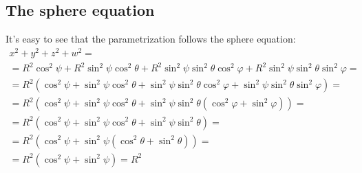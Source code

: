 \documentclass{article}
\begin{document}
\subsection{The sphere equation}
It's easy to see that the parametrization follows the sphere equation:
\begin{equation}
\begin{gathered}
    x^2 + y^2 + z^2 + w^2 = \\
    = R^2\cos^2\psi + R^2\sin^2\psi\cos^2\theta + R^2\sin^2\psi\sin^2\theta\cos^2\varphi + R^2\sin^2\psi\sin^2\theta\sin^2\varphi = \\
    = R^2\left(\cos^2\psi + \sin^2\psi\cos^2\theta + \sin^2\psi\sin^2\theta\cos^2\varphi + \sin^2\psi\sin^2\theta\sin^2\varphi\right) = \\
    = R^2\left(\cos^2\psi + \sin^2\psi\cos^2\theta + \sin^2\psi\sin^2\theta\left(\cos^2\varphi + \sin^2\varphi\right)\right) = \\
    = R^2\left(\cos^2\psi + \sin^2\psi\cos^2\theta + \sin^2\psi\sin^2\theta\right) = \\
    = R^2\left(\cos^2\psi + \sin^2\psi\left(\cos^2\theta + \sin^2\theta\right)\right) = \\ = R^2\left(\cos^2\psi + \sin^2\psi\right) = R^2
\end{gathered}
\end{equation}
\end{document}
